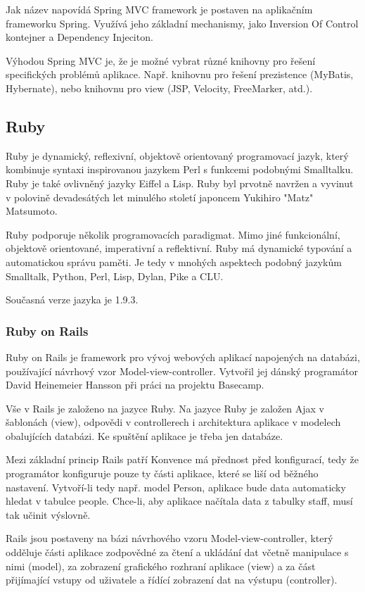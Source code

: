 Jak název napovídá Spring MVC framework je postaven na aplikačním frameworku Spring. Využívá jeho základní mechanismy, jako Inversion Of Control kontejner a Dependency Injeciton.

Výhodou Spring MVC je, že je možné vybrat různé knihovny pro řešení specifických problémů aplikace. Např. knihovnu pro řešení prezistence (MyBatis, Hybernate), nebo knihovnu pro view (JSP, Velocity, FreeMarker, atd.)\cite{liu2006research}.

\subsection{Ruby}
\label{sec:ruby}
Ruby je dynamický, reflexivní, objektově orientovaný programovací jazyk, který kombinuje syntaxi inspirovanou jazykem Perl s funkcemi podobnými Smalltalku. Ruby je také ovlivněný jazyky Eiffel a Lisp. Ruby byl prvotně navržen a vyvinut v polovině devadesátých let minulého století japoncem Yukihiro "Matz" Matsumoto.

Ruby podporuje několik programovacích paradigmat. Mimo jiné funkcionální, objektově orientované, imperativní a reflektivní. Ruby má dynamické typování a automatickou správu paměti. Je tedy v mnohých aspektech podobný jazykům Smalltalk, Python, Perl, Lisp, Dylan, Pike a CLU.

Současná verze jazyka je 1.9.3.
\subsubsection{Ruby on Rails}
\label{sec:ror}
Ruby on Rails je framework pro vývoj webových aplikací napojených na databázi, používající návrhový vzor Model-view-controller. Vytvořil jej dánský programátor David Heinemeier Hansson při práci na projektu Basecamp\cite{website:wiki:ror}.

Vše v Rails je založeno na jazyce Ruby. Na jazyce Ruby je založen Ajax v šablonách (view), odpovědi v controllerech i architektura aplikace v modelech obalujících databázi. Ke spuštění aplikace je třeba jen databáze.

Mezi základní princip Rails patří Konvence má přednost před konfigurací, tedy že programátor konfiguruje pouze ty části aplikace, které se liší od běžného nastavení. Vytvoří-li tedy např. model Person, aplikace bude data automaticky hledat v tabulce people. Chce-li, aby aplikace načítala data z tabulky staff, musí tak učinit výslovně.

Rails jsou postaveny na bázi návrhového vzoru Model-view-controller, který odděluje části aplikace zodpovědné za čtení a ukládání dat včetně manipulace s nimi (model), za zobrazení grafického rozhraní aplikace (view) a za část přijímající vstupy od uživatele a řídící zobrazení dat na výstupu (controller).

